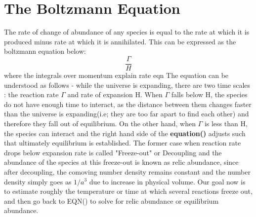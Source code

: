 \documentclass[12pt,a4paper,oneside]{book}
\begin{document}
\section{The Boltzmann Equation}
The rate of change of abundance of any species is equal to the rate at which it is produced minus rate at which it is annihilated. This can be expressed as the boltzmann equation below:
\begin{equation}
  \frac{\Gamma}{H}  
\end{equation}
where the integrals over momentum
\newline explain rate eqn
\newline The equation can be understood as follows -  while the universe is expanding, there are two time scales : the reaction rate $\Gamma$ and rate of expansion H. When $\Gamma$ falls below H, the species do not have enough time to interact, as the distance between them changes faster than the universe is expanding(i.e; they are too far apart to find each other) and therefore they fall out of equilibrium. On the other hand, when $\Gamma$ is less than H, the species can interact and the right hand side of the \textbf{equation()} adjusts such that ultimately equilibrium is established. The former case when reaction rate drops below expansion rate is called "Freeze-out" or Decoupling and the abundance of the species at this freeze-out is known as relic abundance, since after decoupling, the comoving number density remains constant and the number density simply goes as $1/a^3$ due to increase in physical volume.
\newline Our goal now is to estimate roughly the temperature or time at which several reactions freeze out, and then go back to EQN() to solve for relic abundance  or equilibrium abundance.
\end{document}
